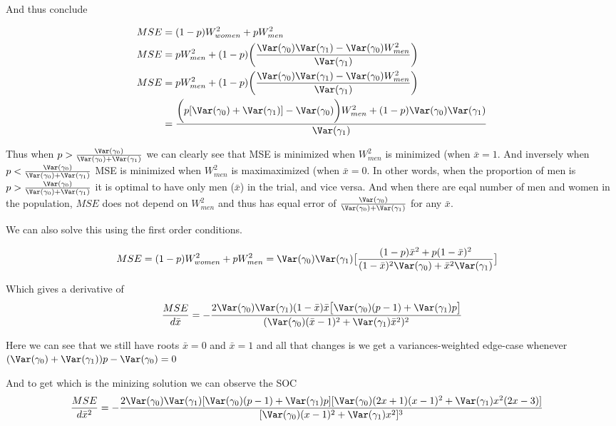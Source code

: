 And thus conclude

\begin{align*}
	MSE &= (1 - p) W^2_{women} + p W^2_{men} \\
	MSE &= p W^{2}_{men} + (1-p) \bigg(\frac{\Var(\gamma_0) \Var(\gamma_1) - \Var(\gamma_0) W^{2}_{men}}{\Var(\gamma_1)} \bigg) \\
	MSE &= p W^{2}_{men} + (1-p) \bigg(\frac{\Var(\gamma_0) \Var(\gamma_1) - \Var(\gamma_0) W^{2}_{men}}{\Var(\gamma_1)} \bigg) \\
	&= \frac{\bigg(p[\Var(\gamma_0) + \Var(\gamma_1)]- \Var(\gamma_0)\bigg) W^{2}_{men} + (1-p) \Var(\gamma_0) \Var(\gamma_1)}{\Var(\gamma_1)}
\end{align*} 

Thus when $p > \frac{\Var(\gamma_0)}{\Var(\gamma_0) + \Var(\gamma_1)}$ we can clearly see that MSE is minimized when $W_{men}^2$ is minimized (when $\bar{x} = 1$. And inversely when $p < \frac{\Var(\gamma_0)}{\Var(\gamma_0) + \Var(\gamma_1)}$ MSE is minimized when $W_{men}^2$ is maximaximized (when $\bar{x} = 0$.
In other words, when the proportion of men is  $p > \frac{\Var(\gamma_0)}{\Var(\gamma_0) + \Var(\gamma_1)}$ it is optimal to have only men ($\bar{x}$) in the trial, and vice versa. And when there are eqal number of men and women in the population,  $MSE$ does not depend on $W_{men}^2$ and thus has equal error of $\frac{\Var(\gamma_0)}{\Var(\gamma_0) + \Var(\gamma_1)}$ for any $\bar{x}$.

We can also solve this using the first order conditions.

\begin{align*}
	MSE = (1-p)W_{women}^2 + p W_{men}^2 &= \Var(\gamma_0) \Var(\gamma_1) \big[ \frac{(1-p)\bar{x}^2 + p(1- \bar{x})^2}{(1-\bar{x})^2 \Var(\gamma_0) + \bar{x}^2 \Var(\gamma_1)} \big]
\end{align*} 

Which gives a derivative of
\begin{align*}
	\frac{MSE}{d\bar{x}} = -\frac{ 2 \Var(\gamma_0) \Var(\gamma_1) (1 - \bar{x}) \bar{x} \big[\Var(\gamma_0) (p - 1) + \Var(\gamma_1) p\big] }{(\Var(\gamma_0) (\bar{x} - 1)^2 + \Var(\gamma_1) \bar{x}^2)^2}
\end{align*} 

Here we can see that we still have roots $\bar{x} = 0$ and $\bar{x} = 1$ and all that changes is we get a variances-weighted edge-case whenever $(\Var(\gamma_0) + \Var(\gamma_1))p - \Var(\gamma_0) = 0$

And to get which is the minizing solution we can observe the SOC 
\begin{align*}
	\frac{MSE}{d \bar{x}^2} &= -\frac{2 \Var(\gamma_0) \Var(\gamma_1) [ \Var(\gamma_0) (p - 1) + \Var(\gamma_1) p ] [ \Var(\gamma_0) (2 x + 1) (x - 1)^2 + \Var(\gamma_1) x^2 (2 x - 3) ]}{[ \Var(\gamma_0) (x - 1)^2 + \Var(\gamma_1) x^2 ]^3}
\end{align*} 

